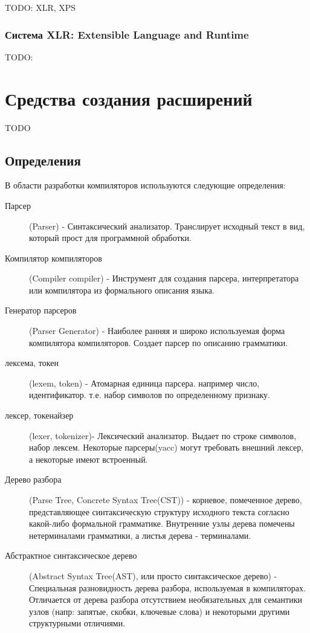 \documentclass[a4paper,12pt]{article}
\begin{document}
TODO: XLR, XPS

\subsubsection*{Система XLR: Extensible Language and Runtime}
\label{xlr}
TODO:

\section{Средства создания расширений}
\label{tools}

TODO

\subsection{Определения}
В области разработки компиляторов используются следующие определения:
\begin{description}
  \item[Парсер] (Parser) -
    Синтаксический анализатор. Транслирует исходный текст в вид, который прост
    для программной обработки.
  \item[Компилятор компиляторов] (Compiler compiler) -
	Инструмент для создания парсера, интерпретатора или компилятора из формального
	описания языка.
  \item[Генератор парсеров] (Parser Generator) -
  	Наиболее ранняя и широко используемая форма компилятора компиляторов.
  	Создает парсер по описанию грамматики. 
  \item[лексема, токен] (lexem, token) - 
  	Атомарная единица парсера. например число, идентификатор. т.е. набор
  	символов по определенному признаку.
  \item[лексер, токенайзер] (lexer, tokenizer)-
  	Лексический анализатор. Выдает по строке символов, набор лексем. Некоторые
  	парсеры(yacc) могут требовать внешний лексер, а некоторые имеют встроенный.
  \item[Дерево разбора] (Parse Tree, Concrete Syntax Tree(CST)) -
  	корневое, помеченное дерево, представляющее синтаксическую структуру
  	исходного текста согласно какой-либо формальной грамматике. Внутренние узлы
  	дерева помечены нетерминалами грамматики, а листья дерева - терминалами.
  \item[Абстрактное синтаксическое дерево] (Abstract Syntax Tree(AST), или
  просто синтаксическое дерево) - Специальная разновидность дерева разбора,
  используемая в компиляторах. Отличается от дерева разбора отсутствием
  необязательных для семантики узлов (напр: запятые, скобки, ключевые слова) и
  некоторыми другими структурными отличиями.
\end{description}
\end{document}
